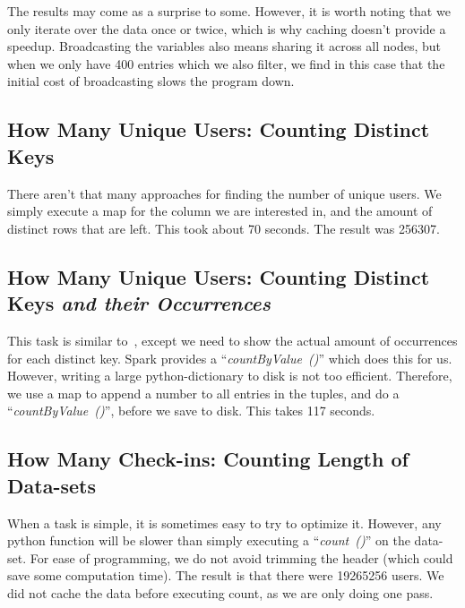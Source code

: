 The results may come as a surprise to some. However, it is worth noting that we only iterate over the data once or twice, which is why caching doesn't provide a speedup. Broadcasting the variables also means sharing it across all nodes, but when we only have 400 entries which we also filter, we find in this case that the initial cost of broadcasting slows the program down.



\subsection{How Many Unique Users: Counting Distinct Keys}\label{sec:distinct}
There aren't that many approaches for finding the number of unique users.
We simply execute a map for the column we are interested in, and the amount of 
distinct rows that are left. This took about 70 seconds. The result was 256307.



\subsection{How Many Unique Users: Counting Distinct Keys \textit{and their Occurrences}}\label{sec:uniqueUsers}
This task is similar to~, except we need to show the actual amount of occurrences for each distinct key. Spark provides a ``\textit{countByValue~()}'' which does this for us. However, writing a large python-dictionary to disk is not too efficient. Therefore, we use a map to append a number to all entries in the tuples, and do a ``\textit{countByValue~()}'', before we save to disk.  This takes 117 seconds.



\subsection{How Many Check-ins: Counting Length of Data-sets}
When a task is simple, it is sometimes easy to try to optimize it. However, any python function
will be slower than simply executing a ``\textit{count~()}'' on the data-set. For ease of programming, we do not avoid trimming the header (which could save some computation time). The result is that there were 19265256 users.
We did not cache the data before executing count, as we are only doing one pass.


